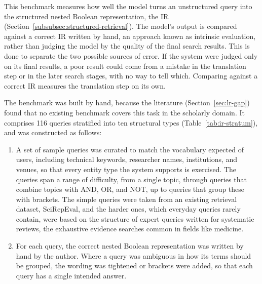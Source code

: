This benchmark measures how well the model turns an unstructured query into the structured nested Boolean representation, the IR (Section~\ref{subsubsec:structured-retrieval}). The model's output is compared against a correct IR written by hand, an approach known as intrinsic evaluation, rather than judging the model by the quality of the final search results. This is done to separate the two possible sources of error. If the system were judged only on its final results, a poor result could come from a mistake in the translation step or in the later search stages, with no way to tell which. Comparing against a correct IR measures the translation step on its own.

The benchmark was built by hand, because the literature (Section~\ref{sec:lr-gap}) found that no existing benchmark covers this task in the scholarly domain. It comprises 116 queries stratified into ten structural types (Table~\ref{tab:ir-stratum}), %
and was constructed as follows:

\begin{enumerate}
    \item A set of sample queries was curated to match the vocabulary expected of users, including technical keywords, researcher names, institutions, and venues, so that every entity type the system supports is exercised. The queries span a range of difficulty, from a single topic, through queries that combine topics with AND, OR, and NOT, up to queries that group these with brackets. The simple queries were taken from an existing retrieval dataset, SciRepEval, and the harder ones, which everyday queries rarely contain, were based on the structure of expert queries written for systematic reviews, the exhaustive evidence searches common in fields like medicine.
    \item For each query, the correct nested Boolean representation was written by hand by the author. %
    Where a query was ambiguous in how its terms should be grouped, the wording was tightened or brackets were added, so that each query has a single intended answer.
\end{enumerate}

